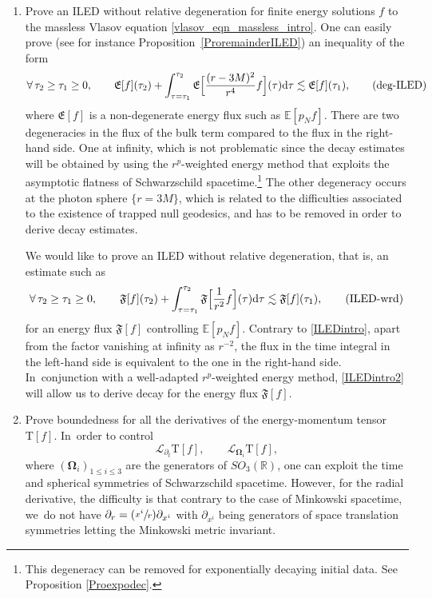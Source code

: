 \documentclass[10pt]{amsart}
\newcommand{\Psfrac}[2]{(\sfrac{#1}{#2})}
\theoremstyle{plain}
\theoremstyle{definition}
\newcommand\R{{\mathbb{R}}}
\newcommand\dr{{\mathrm{d}}}
\begin{document}
\begin{enumerate}
\item\label{pb:a} Prove an ILED without relative degeneration for finite energy solutions $f$ to the massless Vlasov equation \eqref{vlasov_eqn_massless_intro}. One can easily prove (see for instance Proposition~\ref{ProremainderILED}) an inequality of the form
\begin{equation}\label{ILEDintro}
\forall \, \tau_2 \geq \tau_1 \geq 0, \qquad \mathfrak{E}[ f](\tau_2)+\int_{\tau = \tau_1}^{\tau_2} \mathfrak{E} \Bigl[ \frac{(r-3M)^2}{r^4} f\Bigr](\tau) \dr \tau \lesssim \mathfrak{E}[ f](\tau_1), \tag{deg-ILED}
\end{equation}
where $\mathfrak{E}[f]$ is a non-degenerate energy flux such as $\mathbb{E}[p_Nf]$. There are two degeneracies in the flux of the bulk term compared to the flux in the right-hand side. One at infinity, which is not problematic since the decay estimates will be obtained by using the $r^p$-weighted energy method that exploits the asymptotic flatness of Schwarzschild spacetime.\footnote{ This degeneracy can be removed for exponentially decaying initial data. See Proposition \ref{Proexpodec}.} The other degeneracy occurs at the photon sphere $\{r=3M\}$, which is related to the difficulties associated to the existence of trapped null geodesics, and has to be removed in order to derive decay estimates.

We would like to prove an ILED without relative degeneration, that is, an estimate such as
\begin{equation}\label{ILEDintro2}
\forall \, \tau_2 \geq \tau_1 \geq 0, \qquad \mathfrak{F}[ f](\tau_2)+\int_{\tau = \tau_1}^{\tau_2} \mathfrak{F} \Bigl[ \frac{1}{r^2} f\Bigr](\tau) \dr \tau \lesssim \mathfrak{F}[ f](\tau_1), \tag{ILED-wrd}
\end{equation}
for an energy flux $\mathfrak{F}[f]$ controlling $\mathbb{E}[p_Nf]$. Contrary to \eqref{ILEDintro}, apart from the factor vanishing at infinity as $r^{-2}$, the flux in the time integral in the left-hand side is equivalent to the one in the right-hand side. In~conjunction with a well-adapted $r^p$-weighted energy method, \eqref{ILEDintro2} will allow us to derive decay for the energy flux $\mathfrak{F}[f]$.

\item\label{pb:b} Prove boundedness for all the derivatives of the energy-momentum tensor $\mathrm{T}[f]$. In~order to control
\[
\mathcal{L}_{\partial_t}\mathrm{T}[f],\qquad \mathcal{L}_{\mathbf{\Omega}_i}\mathrm{T}[f],
\]
where $(\mathbf{\Omega}_i)_{1 \leq i \leq 3}$ are the generators of $SO_3(\R)$, one can exploit the time and spherical symmetries of Schwarzschild spacetime. However, for the radial derivative, the difficulty is that contrary to the case of Minkowski spacetime, we~do not have $\partial_r = \Psfrac{x^i}{r} \partial_{x^i}$ with $\partial_{x^i}$ being generators of space translation symmetries letting the Minkowski metric invariant.


\end{enumerate}
\end{document}
